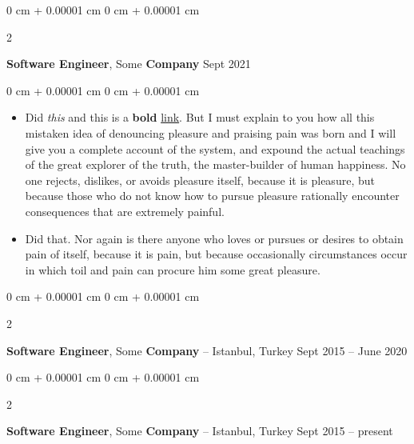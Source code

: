 \documentclass[10pt, letterpaper]{article}
\newenvironment{highlights}{
    \begin{itemize}[
        topsep=0.10 cm,
        parsep=0.10 cm,
        partopsep=0pt,
        itemsep=0pt,
        leftmargin=0 cm + 10pt
    ]
}{
    \end{itemize}
} %
\newenvironment{onecolentry}{
    \begin{adjustwidth}{
        0 cm + 0.00001 cm
    }{
        0 cm + 0.00001 cm
    }
}{
    \end{adjustwidth}
} %
\newenvironment{twocolentry}[2][]{
    \onecolentry
    \def\secondColumn{#2}
    \setcolumnwidth{\fill, 4.5 cm}
    \begin{paracol}{2}
}{
    \switchcolumn \raggedleft \secondColumn
    \end{paracol}
    \endonecolentry
} %
\begin{document}
        \vspace{0.2 cm}

        \begin{twocolentry}{
            Sept 2021
        }
            \textbf{Software Engineer}, Some \textbf{Company}\end{twocolentry}

        \vspace{0.10 cm}
        \begin{onecolentry}
            \begin{highlights}
                \item Did \textit{this} and this is a \textbf{bold} \href{https://example.com}{link}. But I must explain to you how all this mistaken idea of denouncing pleasure and praising pain was born and I will give you a complete account of the system, and expound the actual teachings of the great explorer of the truth, the master-builder of human happiness. No one rejects, dislikes, or avoids pleasure itself, because it is pleasure, but because those who do not know how to pursue pleasure rationally encounter consequences that are extremely painful.
                \item Did that. Nor again is there anyone who loves or pursues or desires to obtain pain of itself, because it is pain, but because occasionally circumstances occur in which toil and pain can procure him some great pleasure.
            \end{highlights}
        \end{onecolentry}


        \vspace{0.2 cm}

        \begin{twocolentry}{
            Sept 2015 – June 2020
        }
            \textbf{Software Engineer}, Some \textbf{Company} -- Istanbul, Turkey\end{twocolentry}



        \vspace{0.2 cm}

        \begin{twocolentry}{
            Sept 2015 – present
        }
            \textbf{Software Engineer}, Some \textbf{Company} -- Istanbul, Turkey\end{twocolentry}
\end{document}

